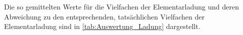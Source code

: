 

Die so gemittelten Werte für die Vielfachen der Elementarladung und deren Abweichung zu den entsprechenden, 
tatsächlichen Vielfachen der Elementarladung sind in \cref{tab:Auswertung_Ladung} dargestellt.

    
	